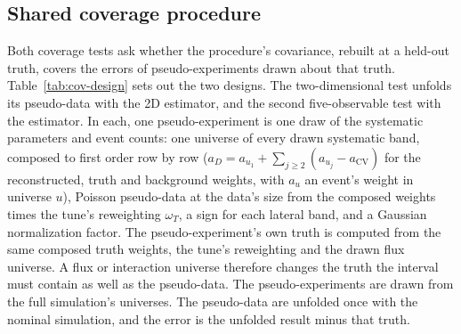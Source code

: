 \subsection{Shared coverage procedure}
\label{supp:covdesign-sec}
\label{supp:covdesign}
Both coverage tests ask whether the procedure's covariance, rebuilt at a held-out truth, covers the errors of pseudo-experiments drawn about that truth. Table~\ref{tab:cov-design} sets out the two designs. The two-dimensional test unfolds its pseudo-data with the 2D estimator, and the second five-observable test with the estimator. In each, one pseudo-experiment is one draw of the systematic parameters and event counts: one universe of every drawn systematic band, composed to first order row by row ($a_D=a_{u_1}+\sum_{j\geq2}(a_{u_j}-a_{\mathrm{CV}})$ for the reconstructed, truth and background weights, with $a_u$ an event's weight in universe $u$), Poisson pseudo-data at the data's size from the composed weights times the tune's reweighting $\omega_T$, a sign for each lateral band, and a Gaussian normalization factor. The pseudo-experiment's own truth is computed from the same composed truth weights, the tune's reweighting and the drawn flux universe. A flux or interaction universe therefore changes the truth the interval must contain as well as the pseudo-data. The pseudo-experiments are drawn from the full simulation's universes. The pseudo-data are unfolded once with the nominal simulation, and the error is the unfolded result minus that truth.
